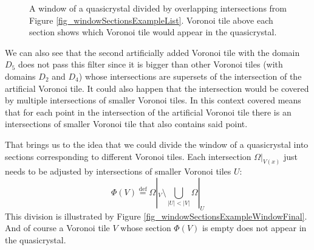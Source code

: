 \documentclass[text.tex]{subfiles}
\begin{document}
\begin{figure}[h!]


\caption{A window of a quasicrystal divided by overlapping intersections from Figure \ref{fig_windowSectionsExampleList}. Voronoi tile above each section shows which Voronoi tile would appear in the quasicrystal. }
\label{fig_windowSectionsExampleWindow}
\end{figure}

We can also see that the second artificially added Voronoi tile with the domain $D_5$  does not pass this filter since it is bigger than other Voronoi tiles (with domains $D_2$ and $D_4$) whose intersections are supersets of the intersection of the artificial Voronoi tile. It could also happen that the intersection would be covered by multiple intersections of smaller Voronoi tiles. In this context covered means that for each point in the intersection of the artificial Voronoi tile there is an intersections of smaller Voronoi tile that also contains said point. 


That brings us to the idea that we could divide the window of a quasicrystal into sections corresponding to different Voronoi tiles. Each intersection $\Omega|_{V(x)}$ just needs to be adjusted by intersections of smaller Voronoi tiles $U$: 
$$\Phi(V) \overset{\text{def}}{=} \Omega|_{V}\setminus\bigcup_{|U|<|V|}\Omega|_{U}$$
This division is illustrated by Figure \ref{fig_windowSectionsExampleWindowFinal}. And of course a Voronoi tile $V$ whose section $\Phi(V)$ is empty does not appear in the quasicrystal. 
\end{document}
